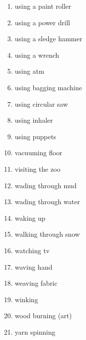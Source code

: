 \documentclass[10pt,twocolumn,letterpaper]{article}
\begin{document}
\begin{enumerate}
\item using a paint roller
\item using a power drill
\item using a sledge hammer
\item using a wrench
\item using atm
\item using bagging machine
\item using circular saw
\item using inhaler
\item using puppets
\item vacuuming floor
\item visiting the zoo
\item wading through mud
\item wading through water
\item waking up
\item walking through snow
\item watching tv
\item waving hand
\item weaving fabric
\item winking
\item wood burning (art)
\item yarn spinning

\end{enumerate}
\end{document}

